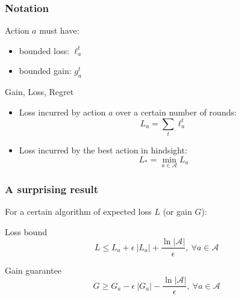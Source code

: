 \documentclass{beamer}
\begin{document}
\begin{frame}
    \frametitle{Notation}

    \begin{block}{Action $a$ must have:}
        \begin{itemize}
            \item bounded loss: $\ell_a^t$
            \item bounded gain: $g_a^t$
        \end{itemize}
    \end{block}

    \begin{block}{Gain, Loss, Regret}
        \begin{itemize}
            \item Loss incurred by action $a$ over a certain number of rounds:
                \begin{equation*}
                    L_a = \sum_t \ell_a^t
                \end{equation*}
            \item Loss incurred by the best action in hindsight:
                \begin{equation*}
                    L_* = \min_{a\in\mathcal{A}} L_a
                \end{equation*}
        \end{itemize}
    \end{block}

\end{frame}

\begin{frame}
    \frametitle{A surprising result}

    For a certain algorithm of expected loss $L$ (or gain $G$):

    \begin{block}{Loss bound}
        \begin{equation*}
            L \leq L_a + \epsilon~|L_a| + \dfrac{\ln|\mathcal{A}|}{\epsilon},
            ~\forall a\in \mathcal{A}
        \end{equation*}
    \end{block}

    \begin{block}{Gain guarantee}
        \begin{equation*}
            G \geq G_a - \epsilon~|G_a| - \dfrac{\ln |\mathcal{A}|}{\epsilon},
            ~\forall a\in \mathcal{A}
        \end{equation*}
    \end{block}

\end{frame}
\end{document}
